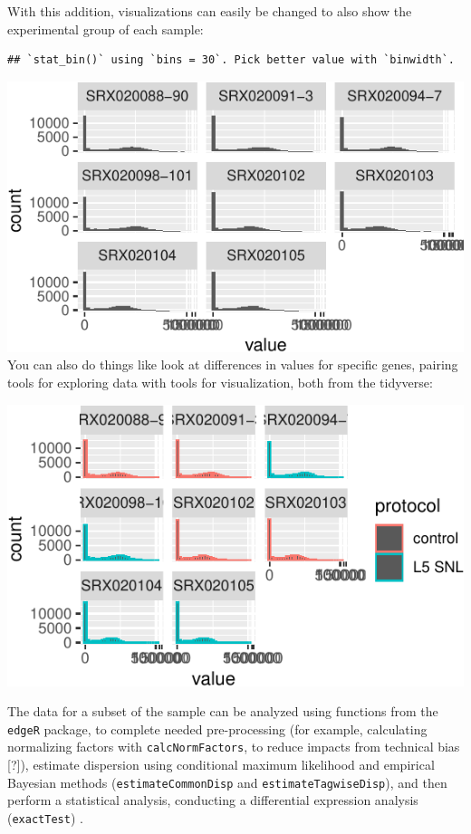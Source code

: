 \documentclass[]{tufte-book}
\begin{document}
With this addition, visualizations can easily be changed to also show the
experimental group of each sample:

\begin{verbatim}
## `stat_bin()` using `bins = 30`. Pick better value with `binwidth`.
\end{verbatim}

\includegraphics{improve_repro_files/figure-latex/unnamed-chunk-12-1}
You can also do things like look at differences in values for
specific genes, pairing tools for exploring data with tools for
visualization, both from the tidyverse:

\includegraphics{improve_repro_files/figure-latex/unnamed-chunk-13-1}

The data for a subset of the sample can be analyzed using functions from the
\texttt{edgeR} package, to complete needed pre-processing (for example, calculating
normalizing factors with \texttt{calcNormFactors}, to reduce impacts from technical
bias {[}?{]}), estimate dispersion using conditional maximum likelihood and
empirical Bayesian methods (\texttt{estimateCommonDisp} and \texttt{estimateTagwiseDisp}), and
then perform a statistical analysis, conducting a differential expression
analysis (\texttt{exactTest}) \citep{chen2014edger}.
\end{document}
